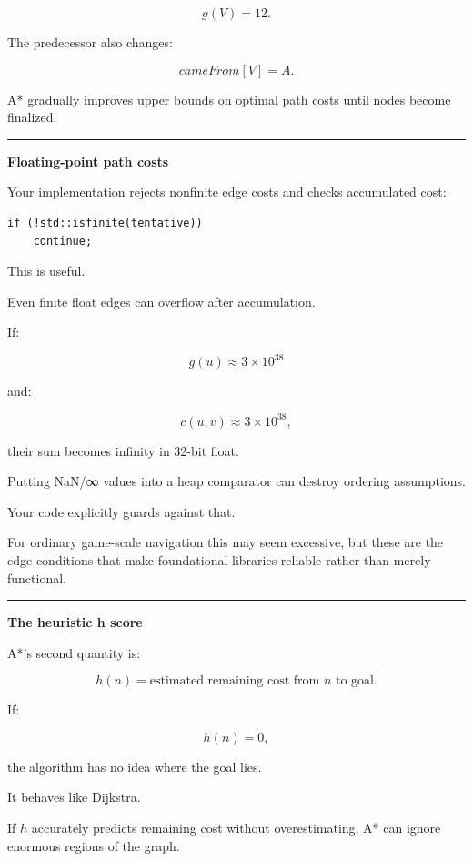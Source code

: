 \[
g(V)=12.
\]

The predecessor also changes:

\[
cameFrom[V]=A.
\]

A* gradually improves upper bounds on optimal path costs until nodes become finalized.

\begin{center}\rule{0.5\linewidth}{0.5pt}\end{center}

\textbf{Floating-point path costs}

Your implementation rejects nonfinite edge costs and checks accumulated cost:

\begin{verbatim}
if (!std::isfinite(tentative))
    continue;
\end{verbatim}

This is useful.

Even finite float edges can overflow after accumulation.

If:

\[
g(u)\approx3\times10^{38}
\]

and:

\[
c(u,v)\approx3\times10^{38},
\]

their sum becomes infinity in 32-bit float.

Putting NaN/∞ values into a heap comparator can destroy ordering assumptions.

Your code explicitly guards against that.

For ordinary game-scale navigation this may seem excessive, but these are the edge conditions that make foundational libraries reliable rather than merely functional.

\begin{center}\rule{0.5\linewidth}{0.5pt}\end{center}

\textbf{The heuristic h score}

A*'s second quantity is:

\[
\boxed{
h(n)=
\text{estimated remaining cost from }n\text{ to goal}.
}
\]

If:

\[
h(n)=0,
\]

the algorithm has no idea where the goal lies.

It behaves like Dijkstra.

If \(h\) accurately predicts remaining cost without overestimating, A* can ignore enormous regions of the graph.

